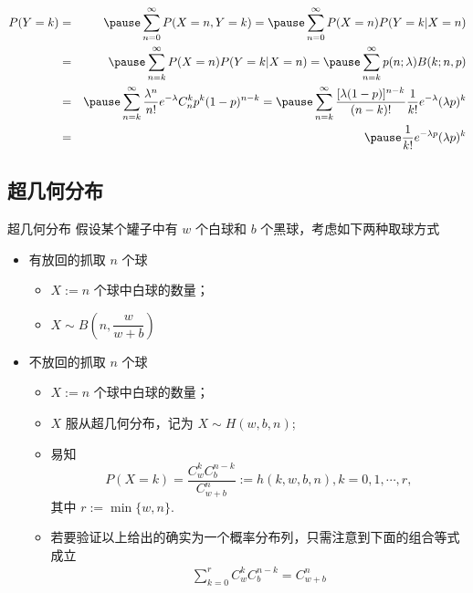 \begin{frame}
	\begin{eqnarray*}
		P(Y=k)&=&\pause \sum_{n=0}^\infty P(X=n, Y=k)=\pause \sum_{n=0}^\infty P(X=n) P(Y=k|X=n)\\
		&=&\pause \sum_{n=k}^\infty P(X=n) P(Y=k|X=n)=\pause \sum_{n=k}^\infty p(n;\lambda)B(k;n,p) \\
		&=&\pause \sum_{n=k}^\infty \dfrac{\lambda^n}{n!}e^{-\lambda}C_n^kp^k(1-p)^{n-k}=\pause \sum_{n=k}^\infty\dfrac{[\lambda(1-p)]^{n-k}}{(n-k)!}\dfrac{1}{k!}e^{-\lambda}(\lambda p)^k\\
		&=&\pause \dfrac{1}{k!}e^{-\lambda p}(\lambda p)^k\\
	\end{eqnarray*}
\end{frame}

\subsection{超几何分布}

\begin{frame}{超几何分布}
	假设某个罐子中有 $w$ 个白球和 $b$ 个黑球，考虑如下两种取球方式
	\begin{itemize}[<+-|alert@+>]
		\item 有放回的抓取 $n$ 个球
		      \begin{itemize}[<+-|alert@+>]
			      \item $X:=n$ 个球中白球的数量；
			            \vspace{0.1cm}
			      \item $X\sim B(n, \dfrac{w}{w+b})$
		      \end{itemize}

		\item 不放回的抓取 $n$ 个球
		      \begin{itemize}[<+-|alert@+>]
			      \item $X:=n$ 个球中白球的数量；
			      \item $X$ 服从超几何分布，记为 $X\sim H (w,b,n)$;
			      \item 易知
			            $$P(X=k)=\frac{C_w^kC_b^{n-k}}{C_{w+b}^n}:=h(k,w,b,n), k=0,1,\cdots,r,$$
			            其中 $r:=\min\{w,n\}$.
			      \item 若要验证以上给出的确实为一个概率分布列，只需注意到下面的组合等式成立
			            \begin{eqnarray*}
				            \sum_{k=0}^rC_w^kC_{b}^{n-k}=C_{w+b}^n
			            \end{eqnarray*}
		      \end{itemize}

	\end{itemize}
\end{frame}




